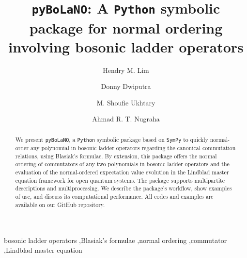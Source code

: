 \documentclass[onecolumn, 12pt, sort&compress]{elsarticle}
\newcounter{bla}
\newenvironment{revision}{}{}
\begin{document}
\sloppy

\begin{frontmatter}

\title{\texttt{pyBoLaNO}: A \texttt{Python} symbolic package for normal ordering involving bosonic ladder operators}

\author[a,b]{Hendry M. Lim}
\author[c,a]{Donny Dwiputra}
\author[a]{M. Shoufie Ukhtary}
\author[a,d]{Ahmad R. T. Nugraha}

\address[a]{Research Center for Quantum Physics, National Research and Innovation Agency (BRIN), South Tangerang 15314, Indonesia}
\address[b]{Department of Physics, Faculty of Mathematics and Natural Sciences, Universitas Indonesia, Depok 16424, Indonesia}
\address[c]{Asia Pacific Center for Theoretical Physics, Pohang 37673, Korea}
\address[d]{Department of Engineering Physics, Telkom University, Bandung 40257, Indonesia}


\begin{abstract}
We present \texttt{pyBoLaNO}, a \texttt{Python} symbolic package based on \texttt{SymPy} to quickly normal-order any polynomial in bosonic ladder operators \begin{revision}regarding the canonical commutation relations, using Blasiak's formulae\end{revision}. By extension, this package offers the normal ordering of commutators of any two polynomials in bosonic ladder operators and the evaluation of the normal-ordered expectation value evolution in the Lindblad master equation framework for open quantum systems. The package supports multipartite descriptions and multiprocessing. We describe the package's workflow, show examples of use, and discuss its computational performance. All codes and examples are available on our GitHub repository.
\end{abstract}


\begin{keyword}
bosonic ladder operators \sep \begin{revision}Blasiak's formulae\end{revision} \sep normal ordering \sep commutator \sep Lindblad master equation

\end{keyword}

\end{frontmatter}
\end{document}
